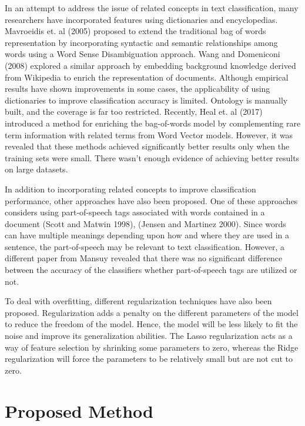 In an attempt to address the issue of related concepts in text classification, many researchers have incorporated features using dictionaries and encyclopedias. Mavroeidis et. al \cite{mavroeidis2005word} (2005) proposed to extend the traditional bag of words representation by incorporating syntactic and semantic relationships among words using a Word Sense Disambiguation approach. Wang and Domeniconi \cite{wang2008building} (2008) explored a similar approach by embedding background knowledge derived from Wikipedia to enrich the representation of documents. Although empirical results have shown improvements in some cases, the applicability of using dictionaries to improve classification accuracy is limited. Ontology is manually built, and the coverage is far too restricted. Recently, Heal et. al \cite{heap2017word} (2017) introduced a method for enriching the bag-of-words model by complementing rare term information with related terms from Word Vector models. However, it was revealed that these methods achieved significantly better results only when the training sets were small. There wasn't enough evidence of achieving better results on large datasets.

In addition to incorporating related concepts to improve classification performance, other approaches have also been proposed. One of these approaches considers using part-of-speech tags associated with words contained in a document (Scott and Matwin \cite{scott1998text} 1998), (Jensen and Martinez \cite{jensen2000improving} 2000). Since words can have multiple meanings depending upon how and where they are used in a sentence, the part-of-speech may be relevant to text classification. However, a different paper from Mansuy \cite{mansuy2006characterization} revealed that there was no significant difference between the accuracy of the classifiers whether part-of-speech tags are utilized or not.

To deal with overfitting, different regularization techniques have also been proposed. Regularization adds a penalty on the different parameters of the model to reduce the freedom of the model. Hence, the model will be less likely to fit the noise and improve its generalization abilities. The Lasso regularization acts as a way of feature selection by shrinking some parameters to zero, whereas the Ridge regularization will force the parameters to be relatively small but are not cut to zero.

\chapter{Proposed Method}

